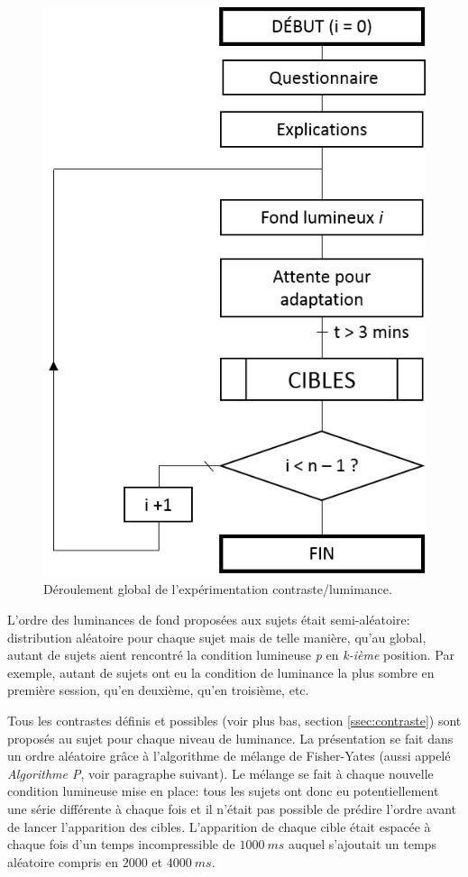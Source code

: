 	\begin{figure}[h][h]
		\centering
		\includegraphics[scale=0.8]{Figures/FlowchartExpeRVPGeneral}
		\caption{Déroulement global de l'expérimentation contraste/lumimance.}
		\label{fig:flowchart_expe_general}
	\end{figure}
	
	\par L'ordre des luminances de fond proposées aux sujets était semi-aléatoire: distribution aléatoire pour chaque sujet mais de telle manière, qu'au global, autant de sujets aient rencontré la condition lumineuse \textit{p} en \textit{k-ième} position. Par exemple, autant de sujets ont eu la condition de luminance la plus sombre en première session, qu'en deuxième, qu'en troisième, etc.
	
	\par Tous les contrastes définis et possibles (voir plus bas, section \ref{ssec:contraste}) sont proposés au sujet pour chaque niveau de luminance. La présentation se fait dans un ordre aléatoire grâce à l'algorithme de mélange de Fisher-Yates (aussi appelé \textit{Algorithme P}, voir paragraphe suivant). Le mélange se fait à chaque nouvelle condition lumineuse mise en place: tous les sujets ont donc eu potentiellement une série différente à chaque fois et il n'était pas possible de prédire l'ordre avant de lancer l'apparition des cibles. L'apparition de chaque cible était espacée à chaque fois d'un temps incompressible de $1000~ms$ auquel s'ajoutait un temps aléatoire compris en $2000$ et $4000~ms$.
	
